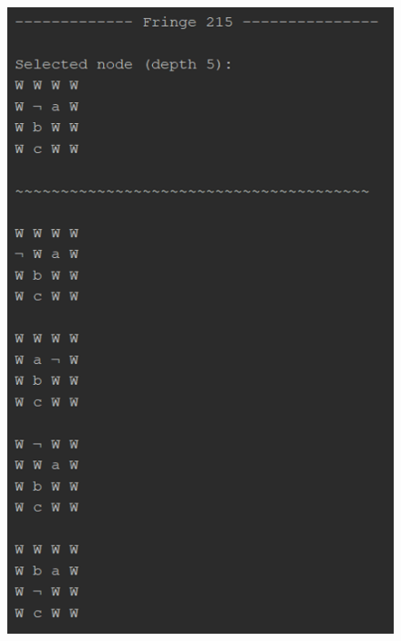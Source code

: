 \documentclass{article}
\begin{document}
	\begin{figure}[h]
		\centering
		\includegraphics[height=0.7\textheight]{IDS-1-4.png}
	\end{figure}
\end{document}
